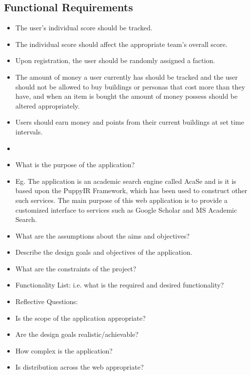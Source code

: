 \documentclass{sig-alt-release2}
\begin{document}
\subsection{Functional Requirements}

\begin{itemize}

\item The user's individual score should be tracked.

\item The individual score should affect the appropriate team's overall score.

\item Upon registration, the user should be randomly assigned a faction.

\item The amount of money a user currently has should be tracked and the user should not be allowed to buy buildings or personas that cost more than they have, and when an item is bought the amount of money possess should be altered appropriately.

\item Users should earn money and points from their current buildings at set time intervals.

\item 

\end{itemize}
 
\begin{itemize}

\item	What is the purpose of the application?

\item	Eg. The application is an academic search engine called AcaSe and is it is based upon the PuppyIR Framework\cite{glassey2011framework}, which has been used to construct other such services\cite{glassey2010fifi,elliot2010fifi}. The main purpose of this web application is to provide a customized interface to services such as Google Scholar and MS Academic Search. 

\item	What are the assumptions about the aims and objectives?

\item	Describe the design goals and objectives of the application.

\item	What are the constraints of the project?

\item	Functionality List: i.e. what is the required and desired functionality?

\item	Reflective Questions: 
\item	Is the scope of the application appropriate? 
\item	Are the design goals realistic/achievable? 
\item	How complex is the application? 
\item	Is distribution across the web appropriate? 

\end{itemize}
\end{document}
